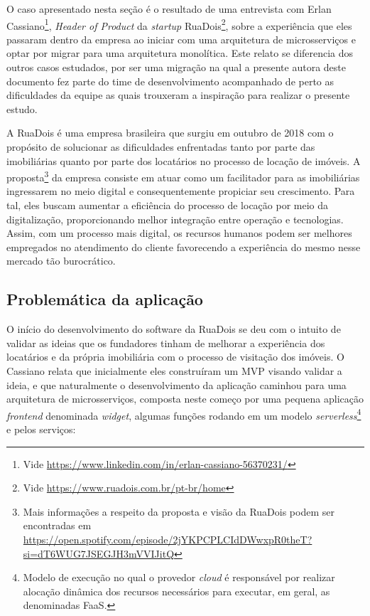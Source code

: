 O caso apresentado nesta seção é o resultado de uma entrevista com Erlan Cassiano\footnote{Vide
\url{https://www.linkedin.com/in/erlan-cassiano-56370231/}}, \textit{Header of Product} da
\textit{startup} RuaDois\footnote{Vide \url{https://www.ruadois.com.br/pt-br/home}}, sobre a
experiência que eles passaram dentro da empresa ao iniciar com uma arquitetura de microsserviços
e optar por migrar para uma arquitetura monolítica. Este relato se diferencia dos outros casos
estudados, por ser uma migração na qual a presente autora deste documento fez parte do time de
desenvolvimento acompanhado de perto as dificuldades da equipe as quais trouxeram a inspiração para
realizar o presente estudo.

A RuaDois é uma empresa brasileira que surgiu em outubro de 2018 com o propósito de
solucionar as dificuldades enfrentadas tanto por parte das imobiliárias quanto por parte dos
locatários no processo de locação de imóveis. A proposta\footnote{Mais informações a respeito
da proposta e visão da RuaDois podem ser encontradas em
\url{https://open.spotify.com/episode/2jYKPCPLCIdDWwxpR0theT?si=dT6WUG7JSEGJH3mVVIJitQ}}
da empresa consiste em atuar como um facilitador para as imobiliárias
ingressarem no meio digital e consequentemente propiciar seu crescimento. Para tal,
eles buscam aumentar a eficiência do processo de locação por meio da digitalização,
proporcionando melhor integração entre operação e tecnologias. Assim, com um processo
mais digital, os recursos humanos podem ser melhores empregados no atendimento do
cliente favorecendo a experiência do mesmo nesse mercado tão burocrático.

\subsection{Problemática da aplicação}

O início do desenvolvimento do software da RuaDois se deu com o intuito de validar as ideias que
os fundadores tinham de melhorar a experiência dos locatários e da própria imobiliária com o processo
de visitação dos imóveis. O Cassiano relata que inicialmente eles construíram um \gls{MVP} visando
validar a ideia, e que naturalmente o desenvolvimento da aplicação caminhou para uma arquitetura de
microsserviços, composta neste começo por uma pequena aplicação \textit{frontend} denominada
\textit{widget}, algumas funções rodando em um modelo \textit{serverless}\footnote{Modelo de
execução no qual o provedor \textit{cloud} é responsável por realizar alocação dinâmica dos recursos
necessários para executar, em geral, as denominadas \gls{FaaS}.} e pelos serviços:

